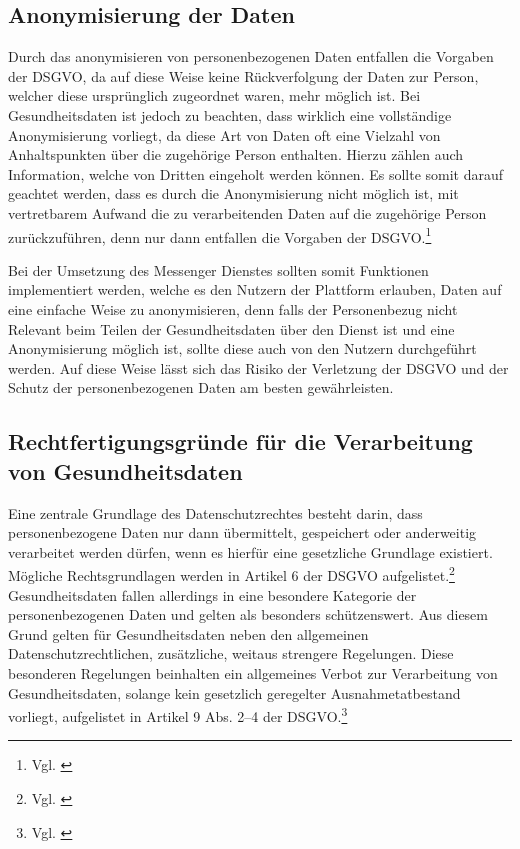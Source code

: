 \subsection{Anonymisierung der Daten}\label{subsection:add}
Durch das anonymisieren von personenbezogenen Daten entfallen die Vorgaben der DSGVO, da auf diese Weise keine Rückverfolgung der Daten zur Person, welcher diese ursprünglich zugeordnet waren, mehr möglich ist. Bei Gesundheitsdaten ist jedoch zu beachten, dass wirklich eine vollständige Anonymisierung vorliegt, da diese Art von Daten oft eine Vielzahl von Anhaltspunkten über die zugehörige Person enthalten. Hierzu zählen auch Information, welche von Dritten eingeholt werden können. Es sollte somit darauf geachtet werden, dass es durch die Anonymisierung nicht möglich ist, mit vertretbarem Aufwand die zu verarbeitenden Daten auf die zugehörige Person zurückzuführen, denn nur dann entfallen die Vorgaben der DSGVO.\footnote{Vgl. \cite[S. 5 f.]{OrientierungshilfezumGesundheitsdatenschutz2018}}

Bei der Umsetzung des Messenger Dienstes sollten somit Funktionen implementiert werden, welche es den Nutzern der Plattform erlauben, Daten auf eine einfache Weise zu anonymisieren, denn falls der Personenbezug nicht Relevant beim Teilen der Gesundheitsdaten über den Dienst ist und eine Anonymisierung möglich ist, sollte diese auch von den Nutzern durchgeführt werden. Auf diese Weise lässt sich das Risiko der Verletzung der DSGVO und der Schutz der personenbezogenen Daten am besten gewährleisten.

\subsection{Rechtfertigungsgründe für die Verarbeitung von Gesundheitsdaten}\label{subsection:rfdvvg}
Eine zentrale Grundlage des Datenschutzrechtes besteht darin, dass personenbezogene Daten nur dann übermittelt, gespeichert oder anderweitig verarbeitet werden dürfen, wenn es hierfür eine gesetzliche Grundlage existiert. Mögliche Rechtsgrundlagen werden in Artikel 6 der DSGVO aufgelistet.\footnote{Vgl. \cite[S. 5 f.]{OrientierungshilfezumGesundheitsdatenschutz2018}} Gesundheitsdaten fallen allerdings in eine besondere Kategorie der personenbezogenen Daten und gelten als besonders schützenswert. Aus diesem Grund gelten für Gesundheitsdaten neben den allgemeinen Datenschutzrechtlichen, zusätzliche, weitaus strengere Regelungen. Diese besonderen Regelungen beinhalten ein allgemeines Verbot zur Verarbeitung von Gesundheitsdaten, solange kein gesetzlich geregelter Ausnahmetatbestand vorliegt, aufgelistet in Artikel 9 Abs. 2–4 der DSGVO.\footnote{Vgl. \cite[S. 20 ff.]{OrientierungshilfezumGesundheitsdatenschutz2018}}


